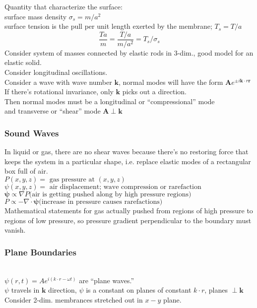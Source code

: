 \documentclass[twoside, 10pt]{amsart}
\begin{document}
Quantity that characterize the surface: \\
\phantom{Quan} surface mass density $\sigma_s = m/a^2$ \\
\phantom{Quan} surface tension is the pull per unit length exerted by the membrane; $T_s = T/a$ 
\[
\frac{Ta}{m} = \frac{ T/a }{ m/a^2 } = T_s / \sigma_s
\]
Consider system of masses connected by elastic rods in 3-dim., good model for an elastic solid.  \\
\phantom{Consi} Consider longitudinal oscillations.  \medskip \\
Consider a wave with wave number $\mathbf{k}$, normal modes will have the form $\mathbf{A} e^{ \pm i \mathbf{k}\cdot r\mathbf{r} }$ \\
If there's rotational invariance, only $\mathbf{k}$ picks out a direction.  \\
\phantom{If} Then normal modes must be a longitudinal or ``compressional'' mode \\
\phantom{If and} and transverse or ``shear'' mode $\mathbf{A} \perp \mathbf{k}$ 

\subsubsection{Sound Waves}
In liquid or gas, there are no shear waves because there's no restoring force that keeps the system in a particular shape, i.e. replace elastic modes of a rectangular box full of air. \\
\phantom{In} $P(x,y,z)  = \text{ gas pressure at $(x,y,z)$ } $\\ 
\phantom{In} $\psi(x,y,z)  = \text{ air displacement; wave compression or rarefaction } $   \smallskip \\
\phantom{In the } $\mathbf{\psi} \propto \nabla P \text{(air is getting pushed along by high pressure regions)}$ \\
\phantom{In the } $P \propto - \nabla \cdot \mathbf{\psi} \text{(increase in pressure causes rarefactions)}$ \\

Mathematical statements for gas actually pushed from regions of high pressure to regions of low pressure, so pressure gradient perpendicular to the boundary must vanish.  

\subsubsection{ Plane Boundaries  } \quad \, \\
$\psi(r,t) =A e^{ i (k\cdot r - \omega t)}$ are ``plane waves.'' \\
$\psi$ travels in $\mathbf{k}$ direction, $\psi$ is a constant on planes of constant $k \cdot r$, planes $\perp \mathbf{k}$\medskip \\
Consider 2-dim. membrances stretched out in $x-y$ plane. 
\end{document}
